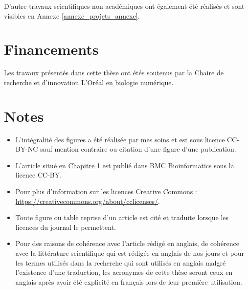 D'autre travaux scientifiques non académiques ont également été réalisés et sont visibles en Annexe \ref{annexe_projets_annexe}.



\section{Financements}

Les travaux présentés dans cette thèse ont étés soutenus par la Chaire de recherche et d'innovation L'Oréal en biologie numérique.

\section{Notes}

\begin{itemize}
    \item L'intégralité des figures a été réalisée par mes soins et est sous licence CC-BY-NC sauf mention contraire ou citation d'une figure d'une publication.
    \item L'article situé en \hyperref[chapter:gwena]{Chapitre 1} est publié dans BMC Bioinformatics sous la licence CC-BY.
    \item Pour plus d'information sur les licences Creative Commons : \url{https://creativecommons.org/about/cclicenses/}.
    \item Toute figure ou table reprise d'un article est cité et traduite lorsque les licences du journal le permettent.
    \item Pour des raisons de cohérence avec l'article rédigé en anglais, de cohérence avec la littérature scientifique qui est rédigée en anglais de nos jours et pour les termes utilisés dans la recherche qui sont utilisés en anglais malgré l'existence d'une traduction, les acronymes de cette thèse seront ceux en anglais après avoir été explicité en français lors de leur première utilisation.
\end{itemize}